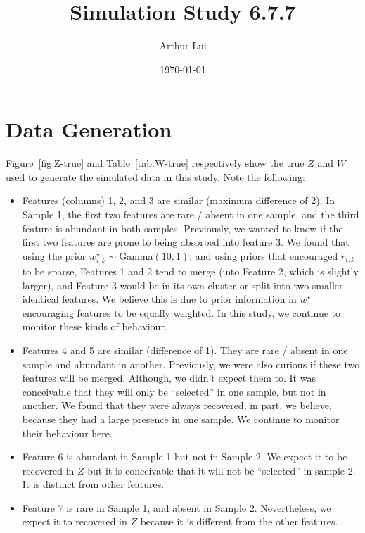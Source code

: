 \documentclass[10pt]{article} %
\title{Simulation Study 6.7.7}
\author{Arthur Lui}
\date{\today} %
\newcommand{\Gam}{ \text{Gamma} }
\begin{document}
\maketitle



\section{Data Generation}\label{sec:data-generation}
Figure~\ref{fig:Z-true} and Table~\ref{tab:W-true} respectively show the true
$Z$ and $W$ used to generate the simulated data in this study. Note the following:
\begin{itemize}
  \item Features (columns) 1, 2, and 3 are similar (maximum difference of 2).
    In Sample 1, the first two features are rare / absent in one sample, and
    the third feature is abundant in both samples. Previously, we wanted to
    know if the first two features are prone to being absorbed into feature 3. We
    found that using the prior $w^\star_{i,k} \sim \Gam(10, 1)$, and using priors
    that encouraged $r_{i,k}$ to be sparse, Features 1 and 2 tend to merge
    (into Feature 2, which is slightly larger), and Feature 3 would be in its
    own cluster or split into two smaller identical features. We believe this is 
    due to prior information in $w^\star$ encouraging features to be equally weighted.
    In this study, we continue to monitor these kinds of behaviour.
  \item Features 4 and 5 are similar (difference of 1). They are rare / absent
    in one sample and abundant in another. Previously, we were also curious if
    these two features will be merged. Although, we didn't expect them to. It was
    conceivable that they will only be ``selected'' in one sample, but not in
    another. We found that they were always recovered, in part, we believe, because
    they had a large presence in one sample. We continue to monitor their behaviour
    here.
  \item Feature 6 is abundant in Sample 1 but not in Sample 2. We expect it to be
    recovered in $Z$ but it is conceivable that it will not be ``selected'' in sample
    2. It is distinct from other features.
  \item Feature 7 is rare in Sample 1, and absent in Sample 2. Nevertheless, we
    expect it to recovered in $Z$ because it is different from the other
    features.
\end{itemize}
\end{document}
